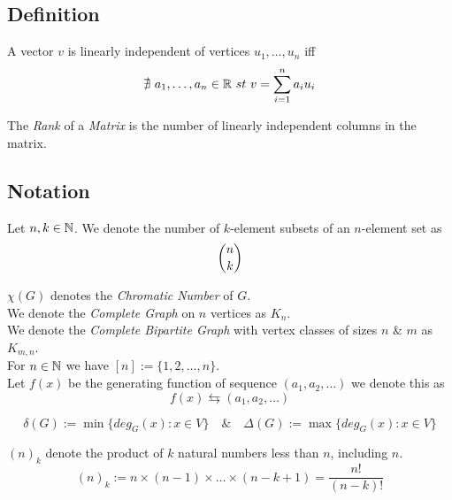 \documentclass[11pt,a4paper]{article}
\begin{document}
\subsection{Definition}

A vector $v$ is linearly independent of vertices $u_1,\dots,u_n$ iff
$$\nexists\ a_1,\dots,a_n\in\reals\ st\ v=\sum_{i=1}^na_iu_i$$

The \textit{Rank} of a \textit{Matrix} is the number of linearly independent columns in the matrix.\\

\subsection{Notation}

Let $n,k\in\mathbb{N}$. We denote the number of $k$-element subsets of an $n$-element set as
$${{n}\choose{k}}$$

$\chi(G)$ denotes the \textit{Chromatic Number} of $G$.\\

We denote the \textit{Complete Graph} on $n$ vertices as $K_n$.\\

We denote the \textit{Complete Bipartite Graph} with vertex classes of sizes $n$ \& $m$ as $K_{m,n}$.\\

For $n\in\mathbb{N}$ we have $[n]:=\{1,2,\dots,n\}$.\\

Let $f(x)$ be the generating function of sequence $(a_1,a_2,\dots)$ we denote this as
$$f(x)\leftrightarrows(a_1,a_2,\dots)$$

$$\delta(G):=\min\{deg_G(x):x\in V\}\quad\&\quad\Delta(G):=\max\{deg_G(x):x\in V\}$$

$(n)_k$ denote the product of $k$ natural numbers less than $n$, including $n$.
$$(n)_k:=n\times(n-1)\times\dots\times(n-k+1)=\dfrac{n!}{(n-k)!}$$
\end{document}
